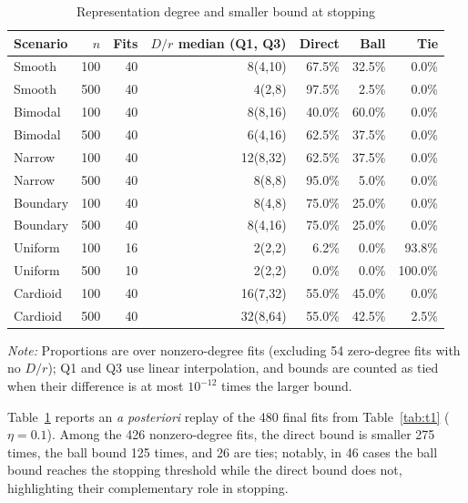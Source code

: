 \begin{table}[htbp]
\centering
\caption{Representation degree and smaller bound at stopping}\label{tab:t2}
\small
\setlength{\tabcolsep}{5pt}
\begin{tabular}{lrrrrrr}
\toprule
Scenario & \(n\) & Fits & \(D/r\) median (Q1, Q3) & Direct & Ball & Tie \\
\midrule
Smooth & 100 & 40 & 8(4,10) & 67.5\% & 32.5\% & 0.0\% \\
Smooth & 500 & 40 & 4(2,8) & 97.5\% & 2.5\% & 0.0\% \\
Bimodal & 100 & 40 & 8(8,16) & 40.0\% & 60.0\% & 0.0\% \\
Bimodal & 500 & 40 & 6(4,16) & 62.5\% & 37.5\% & 0.0\% \\
Narrow & 100 & 40 & 12(8,32) & 62.5\% & 37.5\% & 0.0\% \\
Narrow & 500 & 40 & 8(8,8) & 95.0\% & 5.0\% & 0.0\% \\
Boundary & 100 & 40 & 8(4,8) & 75.0\% & 25.0\% & 0.0\% \\
Boundary & 500 & 40 & 8(4,16) & 75.0\% & 25.0\% & 0.0\% \\
Uniform & 100 & 16 & 2(2,2) & 6.2\% & 0.0\% & 93.8\% \\
Uniform & 500 & 10 & 2(2,2) & 0.0\% & 0.0\% & 100.0\% \\
Cardioid & 100 & 40 & 16(7,32) & 55.0\% & 45.0\% & 0.0\% \\
Cardioid & 500 & 40 & 32(8,64) & 55.0\% & 42.5\% & 2.5\% \\
\bottomrule
\end{tabular}

\vspace{0.3em}
\footnotesize\textit{Note:} Proportions are over nonzero-degree fits (excluding 54 zero-degree fits with no \(D/r\)); Q1 and Q3 use linear interpolation, and bounds are counted as tied when their difference is at most \(10^{-12}\) times the larger bound.
\end{table}

Table~\ref{tab:t2} reports an \emph{a posteriori} replay of the 480 final fits from Table~\ref{tab:t1} (\(\eta=0.1\)). Among the 426 nonzero-degree fits, the direct bound is smaller 275 times, the ball bound 125 times, and 26 are ties; notably, in 46 cases the ball bound reaches the stopping threshold while the direct bound does not, highlighting their complementary role in stopping.


